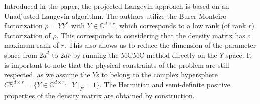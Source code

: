 \documentclass[12pt]{memoir}
\begin{document}
Introduced in the \cite{meth:bayesian:Langevin:ACMT2024} paper, the projected Langevin approach is based on an Unadjusted Langevin algorithm. The authors utilize the Burer-Monteiro factorization $\rho = Y Y^*$ with $Y \in \mathbb{C}^{d \times r}$, which corresponds to a low rank (of rank $r$) factorization of $\rho$. This corresponds to considering that the density matrix has a maximum rank of $r$. This also allows us to reduce the dimension of the parameter space from $2d^2$ to $2dr$ by running the MCMC method directly on the $Y$ space. It is important to note that the physical constraints of the problem are still respected, as we assume the $Y$s to belong to the complex hypersphere $C \mathbb{S}^{d\times r} = \{ Y \in \mathbb{C}^{d\times r}: ||Y||_F = 1\}$. The Hermitian and semi-definite positive properties of the density matrix are obtained by construction.\medskip
\end{document}

